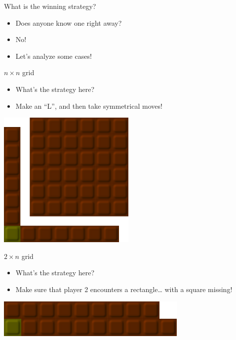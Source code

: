 	\begin{namedframe}{What is the winning strategy?}
		\begin{itemize}[<+->]
			\item Does anyone know one right away?
			\item No!
			\item Let's analyze some cases!
		\end{itemize}
	\end{namedframe}
	\begin{namedframe}{$n \times n$ grid}
		\begin{itemize}[<+->]
			\item What's the strategy here?
			\item Make an ``L'', and then take symmetrical moves!
		\end{itemize}
		\begin{center}
			\includegraphics[width=0.5\textwidth]{Images/Chomp2}
		\end{center}
	\end{namedframe}
	\begin{namedframe}{$2 \times n$ grid}
		\begin{itemize}[<+->]
			\item What's the strategy here?
			\item Make sure that player 2 encounters a rectangle\ldots{} with a square missing!
		\end{itemize}
		\begin{center}
			\includegraphics[width=\textwidth]{Images/Chomp3}
		\end{center}
	\end{namedframe}
